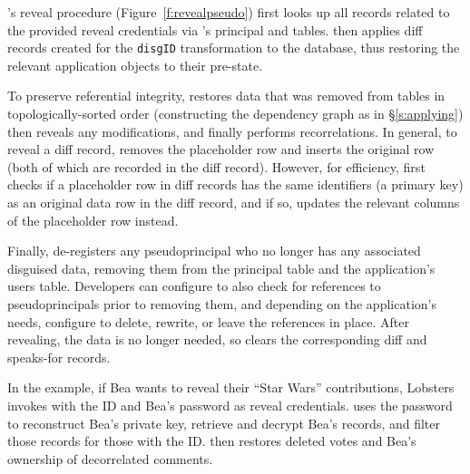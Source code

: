 \sys's reveal procedure (Figure~\ref{f:revealpseudo}) first looks up all \xx
records related to the provided reveal credentials via \sys's principal and \xx
tables.
%
\sys then applies diff records created for the \verb+disgID+ \xx transformation
to the database, thus restoring the relevant
application objects to their pre-\xxed state.

%
To preserve referential integrity, \sys restores
\xxed data that was removed from tables in topologically-sorted order (constructing the dependency graph as in \S\ref{s:applying})
%
\sys then reveals any modifications, and finally performs recorrelations. 
%
In general, to reveal a diff record, \sys removes the placeholder row
and inserts the original row (both of which are recorded in the diff record).
%
However, for efficiency, \sys first checks if a placeholder row in diff records
has the same identifiers (\eg a primary key) as an original data row in the diff
record, and if so, updates the relevant columns of the placeholder row instead.
%

%
Finally, \sys de-registers any pseudoprincipal who no longer has any associated
disguised data, removing them from the principal table and the application's
users table.
%
Developers can configure \sys to also check for references to pseudoprincipals
prior to removing them, and depending on the application's needs, configure \sys
to delete, rewrite, or leave the references in place.
%
After revealing, the \xxed data is no longer needed, so \sys clears the
corresponding diff and speaks-for records.
%

%
In the example, if Bea wants to reveal their ``Star Wars'' contributions,
Lobsters invokes \sys with the \xx ID and Bea's password as reveal credentials.
%
\sys uses the password to reconstruct Bea's private key, retrieve and decrypt
Bea's records, and filter those records for those with the \xx ID.
%
\sys then restores deleted votes and Bea's ownership of
decorrelated comments.
%

